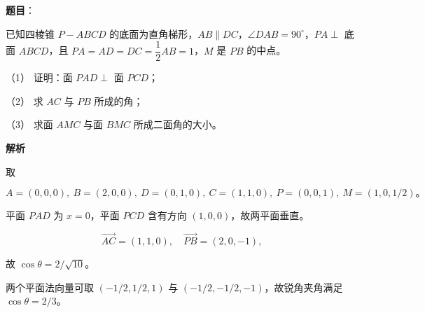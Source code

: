 \begin{answer}

\textbf{题目}：

已知四棱锥 $P-ABCD$ 的底面为直角梯形，$AB\parallel DC$，$\angle DAB=90^\circ$，$PA\perp$ 底面 $ABCD$，且 $PA=AD=DC=\dfrac12AB=1$，$M$ 是 $PB$ 的中点。
\nopagebreak[4]
\begin{center}\end{center}
\nopagebreak[4]
（1） 证明：面 $PAD\perp$ 面 $PCD$；

（2） 求 $AC$ 与 $PB$ 所成的角；

（3） 求面 $AMC$ 与面 $BMC$ 所成二面角的大小。

\textbf{解析}

取

\nopagebreak[4]
\[
A=(0,0,0),\ B=(2,0,0),\ D=(0,1,0),\ C=(1,1,0),\ P=(0,0,1),\ M=(1,0,1/2)\text{。}
\]


平面 $PAD$ 为 $x=0$，平面 $PCD$ 含有方向 $(1,0,0)$，故两平面垂直。


\nopagebreak[4]
\[
\overrightarrow{AC}=(1,1,0),\quad\overrightarrow{PB}=(2,0,-1),
\]

故 $\cos\theta=2/\sqrt{10}$。


两个平面法向量可取 $(-1/2,1/2,1)$ 与 $(-1/2,-1/2,-1)$，故锐角夹角满足 $\cos\theta=2/3$。




\end{answer}
